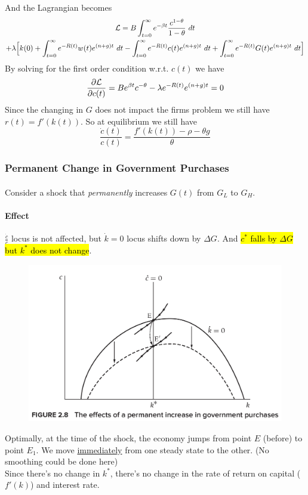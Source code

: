 \documentclass[11pt]{article}
\begin{document}
			And the Lagrangian becomes
			\begin{gather*}
				\mathcal{{L}} = B \int_{t=0}^\infty e^{-\beta t} \frac{c^{1-\theta}}{1-\theta}\ dt \\
				+ \lambda \Big[ k(0) + \int_{t=0}^\infty e^{-R(t)} w(t) e^{(n+g)t} \ dt - \int_{t=0}^\infty e^{-R(t)} c(t) e^{(n+g)t}\ dt + \int_{t=0}^\infty e^{-R(t)} G(t) e^{(n+g)t}\ dt\Big]
			\end{gather*}
			By solving for the first order condition w.r.t. $c(t)$ we have 
			\[
				\frac{\partial{\mathcal{{L}}}}{\partial{c(t)}} = B e^{\beta t} c^{-\theta} - \lambda e^{-R(t)} e^{(n+g)t} = 0
			\]
			Since the changing in $G$ does not impact the firms problem we still have $r(t) = f'(k(t))$.
			So at equilibrium we still have 
			\[
				\frac{\dot{c}(t)}{c(t)} = \frac{f'(k(t)) - \rho - \theta g}{\theta}
			\]
			
			\subsubsection{Permanent Change in Government Purchases}
			\paragraph{}Consider a shock that \emph{permanently} increases $G(t)$ from $G_L$ to $G_H$.
			
			\paragraph{Effect} $\frac{\dot{c}}{c}$ locus is not affected, but $\dot{k}=0$ locus shifts down by $\Delta G$. And \hl{$c^*$ falls by $\Delta G$ but $k^*$ does not change}.
			\begin{figure}[h]
				\centering
				\includegraphics[width=0.8\linewidth]{figures/7_2}
			\end{figure}
			Optimally, at the time of the shock, the economy jumps from point $E$ (before) to point $E_1$. We move \ul{immediately} from one steady state to the other. (No smoothing could be done here) \\
			Since there's no change in $k^*$, there's no change in the rate of return on capital ($f'(k)$) and interest rate.
		
\end{document}
